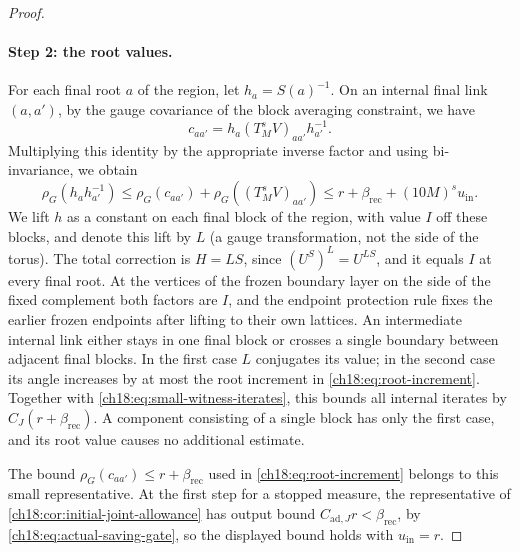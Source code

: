 \begin{proof}
\paragraph{Step 2: the root values.}
For each final root $a$ of the region, let $h_a=S(a)^{-1}$. On an internal final link $(a,a')$, by the gauge covariance of the block averaging constraint, we have
\[
 c_{aa'}=h_a(T_M^sV)_{aa'}h_{a'}^{-1}.
\]
Multiplying this identity by the appropriate inverse factor and using bi-invariance, we obtain
\begin{equation}\label{ch18:eq:root-increment}
 \rho_G(h_ah_{a'}^{-1})
 \le \rho_G(c_{aa'})+\rho_G((T_M^sV)_{aa'})
 \le r+\beta_{\mathrm{rec}}+(10M)^s u_{\mathrm{in}}.
\end{equation}
We lift $h$ as a constant on each final block of the region, with value $I$ off these blocks, and denote this lift by $L$ (a gauge transformation, not the side of the torus). The total correction is $H=LS$, since $(U^S)^L=U^{LS}$, and it equals $I$ at every final root. At the vertices of the frozen boundary layer on the side of the fixed complement both factors are $I$, and the endpoint protection rule fixes the earlier frozen endpoints after lifting to their own lattices. An intermediate internal link either stays in one final block or crosses a single boundary between adjacent final blocks. In the first case $L$ conjugates its value; in the second case its angle increases by at most the root increment in \eqref{ch18:eq:root-increment}. Together with \eqref{ch18:eq:small-witness-iterates}, this bounds all internal iterates by $C_J(r+\beta_{\mathrm{rec}})$. A component consisting of a single block has only the first case, and its root value causes no additional estimate.

The bound $\rho_G(c_{aa'})\le r+\beta_{\mathrm{rec}}$ used in \eqref{ch18:eq:root-increment} belongs to this small representative. At the first step for a stopped measure, the representative of \cref{ch18:cor:initial-joint-allowance} has output bound $C_{\mathrm{ad},J}r<\beta_{\mathrm{rec}}$, by \eqref{ch18:eq:actual-saving-gate}, so the displayed bound holds with $u_{\mathrm{in}}=r$.


\end{proof}
